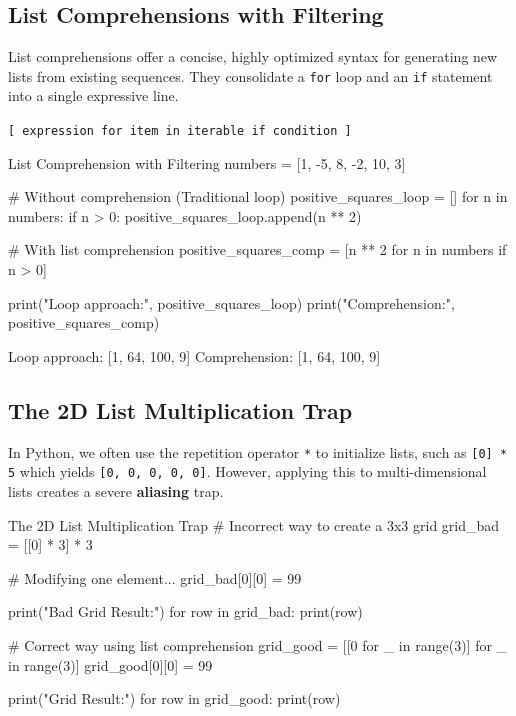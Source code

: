 \subsection{List Comprehensions with Filtering}

List comprehensions offer a concise, highly optimized syntax for generating new lists from existing sequences. They consolidate a \texttt{for} loop and an \texttt{if} statement into a single expressive line.

\begin{syntaxbox}
\texttt{[ expression for item in iterable if condition ]}
\end{syntaxbox}

\begin{pythoncode}[]{List Comprehension with Filtering}
numbers = [1, -5, 8, -2, 10, 3]

# Without comprehension (Traditional loop)
positive_squares_loop = []
for n in numbers:
    if n > 0:
        positive_squares_loop.append(n ** 2)

# With list comprehension
positive_squares_comp = [n ** 2 for n in numbers if n > 0]

print("Loop approach:", positive_squares_loop)
print("Comprehension:", positive_squares_comp)
\end{pythoncode}

\begin{outputbox}
Loop approach: [1, 64, 100, 9]
Comprehension: [1, 64, 100, 9]
\end{outputbox}

\subsection{The 2D List Multiplication Trap}

In Python, we often use the repetition operator \texttt{*} to initialize lists, such as \texttt{[0] * 5} which yields \texttt{[0, 0, 0, 0, 0]}. However, applying this to multi-dimensional lists creates a severe \textbf{aliasing} trap.

\begin{pythoncode}[]{The 2D List Multiplication Trap}
# Incorrect way to create a 3x3 grid
grid_bad = [[0] * 3] * 3

# Modifying one element...
grid_bad[0][0] = 99

print("Bad Grid Result:")
for row in grid_bad:
    print(row)

# Correct way using list comprehension
grid_good = [[0 for _ in range(3)] for _ in range(3)]
grid_good[0][0] = 99

print("\nGood Grid Result:")
for row in grid_good:
    print(row)
\end{pythoncode}

